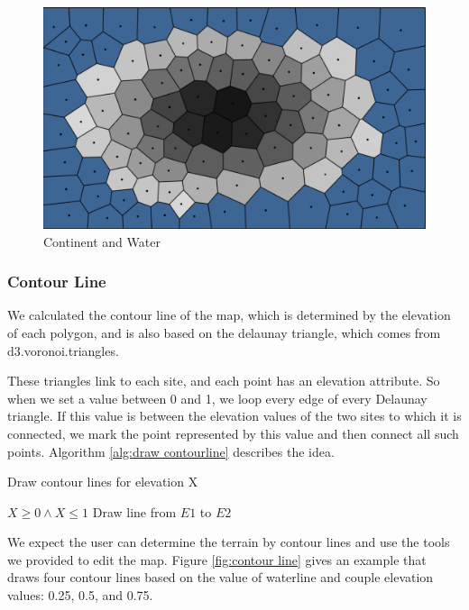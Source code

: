 \begin{figure}[htbp]
\centering
\includegraphics[width=\textwidth]{section04/assets/Map-heightmap.png}
\caption[Continent and Water]{\label{fig:Height Map}Continent and Water}
\end{figure}

\subsubsection{Contour Line}
We calculated the contour line of the map, which is determined by the elevation of each polygon, and is also based on the delaunay triangle, which comes from d3.voronoi.triangles.

These triangles link to each site, and each point has an elevation attribute. So when we set a value between 0 and 1, we loop every edge of every Delaunay triangle. If this value is between the elevation values of the two sites to which it is connected, we mark the point represented by this value and then connect all such points. Algorithm \ref{alg:draw contourline} describes the idea.

\begin{algorithm}
\caption{Draw contour lines for elevation X}
\label{alg:draw contourline}
\begin{algorithmic}
\REQUIRE $X \geq 0 \wedge X \leq 1$
\STATE Draw line from $E1$ to $E2$
\ENDIF
\ENDFOR
\ENDFOR
\end{algorithmic}
\end{algorithm}

We expect the user can determine the terrain by contour lines and use the tools we provided to edit the map. Figure \ref{fig:contour line} gives an example that draws four contour lines based on the value of waterline and couple elevation values: 0.25, 0.5, and 0.75.

